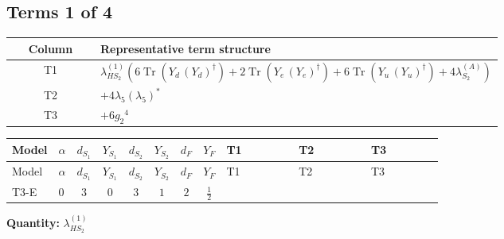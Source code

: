 \documentclass[8pt]{article}
\begin{document}
\begin{landscape}
\subsection*{Terms 1 of 4}
\begin{center}
\begin{tabular}{@{}c >{\raggedright\arraybackslash}p{0.82\linewidth}@{}}
\toprule
Column & Representative term structure \\
\midrule
T1 & \(\displaystyle {\lambda_{HS_2}^{(1)}} (6 \operatorname{Tr}\!\left({Y_d}\,\left({Y_d}\right)^{\dagger}\right)+2 \operatorname{Tr}\!\left({Y_e}\,\left({Y_e}\right)^{\dagger}\right)+6 \operatorname{Tr}\!\left({Y_u}\,\left({Y_u}\right)^{\dagger}\right)+4 {\lambda_{S_2}^{(A)}})\) \\
\midrule
T2 & \(\displaystyle +4 {\lambda_5} \left({\lambda_5}\right)^{*}\) \\
\midrule
T3 & \(\displaystyle +6 {g_2}^4\) \\
\midrule
\bottomrule
\end{tabular}
\end{center}
\smallskip
\tiny
\begin{longtable}{@{}llcccccc >{\raggedright\arraybackslash}p{0.21\linewidth} >{\raggedright\arraybackslash}p{0.21\linewidth} >{\raggedright\arraybackslash}p{0.21\linewidth}@{}}
\toprule
Model & $\alpha$ & $d_{S_1}$ & $Y_{S_1}$ & $d_{S_2}$ & $Y_{S_2}$ & $d_F$ & $Y_F$ & T1 & T2 & T3 \\
\midrule
\endfirsthead
\toprule
Model & $\alpha$ & $d_{S_1}$ & $Y_{S_1}$ & $d_{S_2}$ & $Y_{S_2}$ & $d_F$ & $Y_F$ & T1 & T2 & T3 \\
\midrule
\endhead
T3-E & $0$ & $3$ & $0$ & $3$ & $1$ & $2$ & $\frac{1}{2}$ & \scriptsize\adjustbox{max width=\linewidth}{$\begin{gathered} {\lambda_{HS_2}^{(1)}} (6 \operatorname{Tr}\!\left({Y_d}\,\left({Y_d}\right)^{\dagger}\right)+2 \operatorname{Tr}\!\left({Y_e}\,\left({Y_e}\right)^{\dagger}\right)+6 \operatorname{Tr}\!\left({Y_u}\,\left({Y_u}\right)^{\dagger}\right)+4 {\lambda_{S_2}^{(A)}})\end{gathered}$} & \scriptsize\adjustbox{max width=\linewidth}{$\begin{gathered} +4 {\lambda_5} \left({\lambda_5}\right)^{*}\end{gathered}$} & \scriptsize\adjustbox{max width=\linewidth}{$\begin{gathered} +6 {g_2}^4\end{gathered}$} \\
\midrule
\bottomrule
\end{longtable}
\clearpage
\noindent\textbf{Quantity: }$\lambda_{HS_2}^{(1)}$\par\smallskip

\end{landscape}
\end{document}
